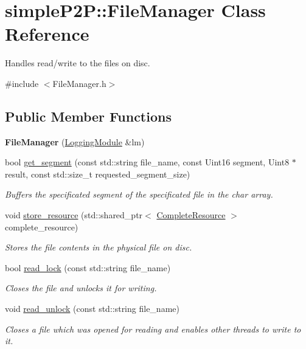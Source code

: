 \hypertarget{classsimpleP2P_1_1FileManager}{}\section{simple\+P2P\+:\+:File\+Manager Class Reference}
\label{classsimpleP2P_1_1FileManager}


Handles read/write to the files on disc.  




{\ttfamily \#include $<$File\+Manager.\+h$>$}

\subsection*{Public Member Functions}
\begin{DoxyCompactItemize}
\item 
\mbox{\label{classsimpleP2P_1_1FileManager_a335188a96b1d257ed0ecdaf76befec95}} 
{\bfseries File\+Manager} (\hyperlink{classsimpleP2P_1_1LoggingModule}{Logging\+Module} \&lm)
\item 
bool \hyperlink{classsimpleP2P_1_1FileManager_ae6d78d28f40cc7fabe16de7a124a38be}{get\+\_\+segment} (const std\+::string file\+\_\+name, const Uint16 segment, Uint8 $\ast$result, const std\+::size\+\_\+t requested\+\_\+segment\+\_\+size)
\begin{DoxyCompactList}\small\item\em Buffers the specificated segment of the specificated file in the char array. \end{DoxyCompactList}\item 
void \hyperlink{classsimpleP2P_1_1FileManager_a120fec780f9a6bf350ffbac731376213}{store\+\_\+resource} (std\+::shared\+\_\+ptr$<$ \hyperlink{classsimpleP2P_1_1CompleteResource}{Complete\+Resource} $>$ complete\+\_\+resource)
\begin{DoxyCompactList}\small\item\em Stores the file contents in the physical file on disc. \end{DoxyCompactList}\item 
bool \hyperlink{classsimpleP2P_1_1FileManager_ad20db5b0d3c3eea9f22ddef7b28c3348}{read\+\_\+lock} (const std\+::string file\+\_\+name)
\begin{DoxyCompactList}\small\item\em Closes the file and unlocks it for writing. \end{DoxyCompactList}\item 
void \hyperlink{classsimpleP2P_1_1FileManager_a5152eb630ec61c6465f3302934696c12}{read\+\_\+unlock} (const std\+::string file\+\_\+name)
\begin{DoxyCompactList}\small\item\em Closes a file which was opened for reading and enables other threads to write to it. \end{DoxyCompactList}\end{DoxyCompactItemize}


